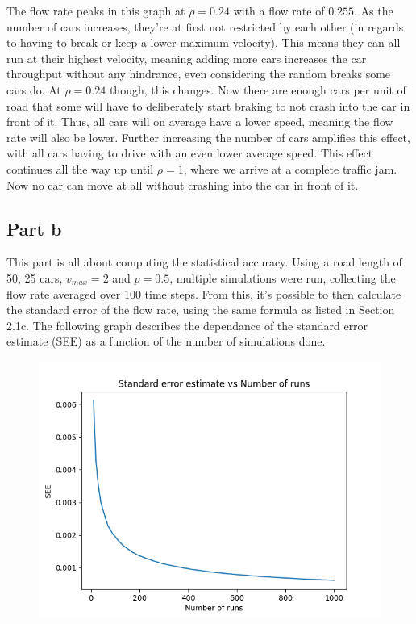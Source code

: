 \documentclass[a4paper,12pt]{article}
\begin{document}
The flow rate peaks in this graph at $\rho = 0.24$ with a flow rate of $0.255$. As the number of cars increases,
they're at first not restricted by each other (in regards to having to break or keep a lower maximum velocity). This
means they can all run at their highest velocity, meaning adding more cars increases the car throughput without any
hindrance, even considering the random breaks some cars do. At $\rho = 0.24$ though, this changes. Now there are
enough cars per unit of road that some will have to deliberately start braking to not crash into the car in front
of it. Thus, all cars will on average have a lower speed, meaning the flow rate will also be lower. Further increasing
the number of cars amplifies this effect, with all cars having to drive with an even lower average speed. This effect
continues all the way up until $\rho = 1$, where we arrive at a complete traffic jam. Now no car can move at all
without crashing into the car in front of it.

\subsection*{Part b}

This part is all about computing the statistical accuracy. Using a road length of 50, 25 cars, $v_{max} = 2$ and
$p = 0.5$, multiple simulations were run, collecting the flow rate averaged over 100 time steps. From this, it's
possible to then calculate the standard error of the flow rate, using the same formula as listed in Section 2.1c.
The following graph describes the dependance of the standard error estimate (SEE) as a function of the number of
simulations done.

\begin{figure}[!ht]
  \centering
  \includegraphics[scale=0.48]{img/2_2b_SEE.png}
\end{figure}
\end{document}
